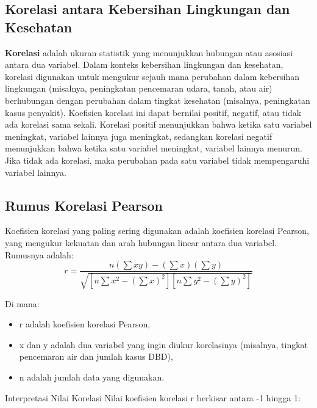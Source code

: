 \documentclass[
]{article}
\providecommand{\tightlist}{%
  \setlength{\itemsep}{0pt}\setlength{\parskip}{0pt}}
\begin{document}
\hypertarget{korelasi-antara-kebersihan-lingkungan-dan-kesehatan}{%
\subsection{Korelasi antara Kebersihan Lingkungan dan
Kesehatan}\label{korelasi-antara-kebersihan-lingkungan-dan-kesehatan}}

\textbf{Korelasi} adalah ukuran statistik yang menunjukkan hubungan atau
asosiasi antara dua variabel. Dalam konteks kebersihan lingkungan dan
kesehatan, korelasi digunakan untuk mengukur sejauh mana perubahan dalam
kebersihan lingkungan (misalnya, peningkatan pencemaran udara, tanah,
atau air) berhubungan dengan perubahan dalam tingkat kesehatan
(misalnya, peningkatan kasus penyakit). Koefisien korelasi ini dapat
bernilai positif, negatif, atau tidak ada korelasi sama sekali. Korelasi
positif menunjukkan bahwa ketika satu variabel meningkat, variabel
lainnya juga meningkat, sedangkan korelasi negatif menunjukkan bahwa
ketika satu variabel meningkat, variabel lainnya menurun. Jika tidak ada
korelasi, maka perubahan pada satu variabel tidak mempengaruhi variabel
lainnya.

\hypertarget{rumus-korelasi-pearson}{%
\subsection{Rumus Korelasi Pearson}\label{rumus-korelasi-pearson}}

Koefisien korelasi yang paling sering digunakan adalah koefisien
korelasi Pearson, yang mengukur kekuatan dan arah hubungan linear antara
dua variabel. Rumusnya adalah: \[
r = \frac{n \left( \sum xy \right) - \left( \sum x \right) \left( \sum y \right)}{\sqrt{ \left[ n \sum x^2 - \left( \sum x \right)^2 \right] \left[ n \sum y^2 - \left( \sum y \right)^2 \right] }}
\]

Di mana:

\begin{itemize}
\tightlist
\item
  r adalah koefisien korelasi Pearson,
\item
  x dan y adalah dua variabel yang ingin diukur korelasinya (misalnya,
  tingkat pencemaran air dan jumlah kasus DBD),
\item
  n adalah jumlah data yang digunakan.
\end{itemize}

Interpretasi Nilai Korelasi Nilai koefisien korelasi r berkisar antara
-1 hingga 1:
\end{document}

